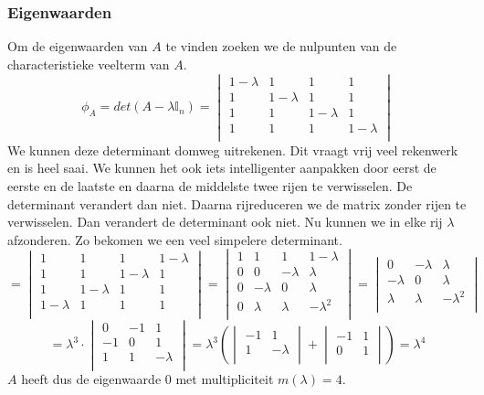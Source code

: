 \documentclass[lineaire_algebra_oplossingen.tex]{subfiles}
\begin{document}
\subsubsection*{Eigenwaarden}
Om de eigenwaarden van $A$ te vinden zoeken we de nulpunten van de characteristieke veelterm van $A$.
\[
\phi_A = det(A-\lambda\mathbb{I}_n) =
\begin{vmatrix}
1-\lambda & 1 & 1 & 1\\
1 & 1-\lambda & 1 & 1\\
1 & 1 & 1-\lambda & 1\\
1 & 1 & 1 & 1-\lambda\\
\end{vmatrix}
\]
We kunnen deze determinant domweg uitrekenen. Dit vraagt vrij veel rekenwerk en is heel saai. We kunnen het ook iets intelligenter aanpakken door eerst de eerste en de laatste en daarna de middelste twee rijen te verwisselen. De determinant verandert dan niet. Daarna rijreduceren we de matrix zonder rijen te verwisselen. Dan verandert de determinant ook niet. Nu kunnen we in elke rij $\lambda$ afzonderen. Zo bekomen we een veel simpelere determinant.
\[
=
\begin{vmatrix}
1 & 1 & 1 & 1-\lambda\\
1 & 1 & 1-\lambda & 1\\
1 & 1-\lambda & 1 & 1\\
1-\lambda & 1 & 1 & 1\\
\end{vmatrix}
=
\begin{vmatrix}
1 & 1 & 1 & 1-\lambda\\
0 & 0 & -\lambda & \lambda\\
0 & -\lambda & 0 & \lambda\\
0 & \lambda & \lambda & -\lambda^2\\
\end{vmatrix}
=
\begin{vmatrix}
0 & -\lambda & \lambda\\
-\lambda & 0 & \lambda\\
\lambda & \lambda & -\lambda^2\\
\end{vmatrix}
\]
\[
= \lambda^3\cdot
\begin{vmatrix}
0 & -1 & 1\\
-1 & 0 & 1\\
1 & 1 & -\lambda\\
\end{vmatrix}
=
\lambda^3
\left(
\begin{vmatrix}
-1 & 1\\
1 & -\lambda\\
\end{vmatrix}
+
\begin{vmatrix}
-1 & 1\\
0 & 1\\
\end{vmatrix}
\right)
=
\lambda^4
\]
$A$ heeft dus de eigenwaarde $0$ met multipliciteit $m(\lambda) = 4$.
\end{document}
